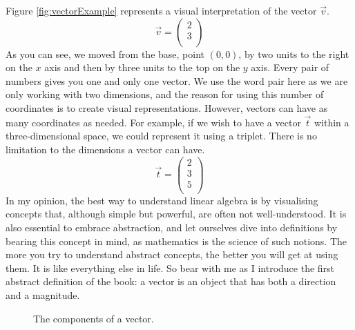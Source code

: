 \documentclass[600paper, 11pt,twoside,openany]{kdp}
\begin{document}
\indent Figure \ref{fig:vectorExample} represents a visual interpretation of the vector $\overrightarrow{v}$.
\[\overrightarrow{v} = \begin{pmatrix}
 2\\
 3\\
\end{pmatrix}\]
\indent As you can see, we moved from the base, point $(0,0)$, by two units to the right on the $x$ axis and then by three units to the top on the $y$ axis. Every pair of numbers gives you one and only one vector. We use the word pair here as we are only working with two dimensions, and the reason for using this number of coordinates is to create visual representations. However, vectors can have as many coordinates as needed. For example, if we wish to have a vector $\overrightarrow{t}$ within a three-dimensional space, we could represent it using a triplet. There is no limitation to the dimensions a vector can have.
\[\overrightarrow{t} = \begin{pmatrix}
 2\\
 3\\
 5\\
\end{pmatrix}\]
\indent In my opinion, the best way to understand linear algebra is by visualising concepts that, although simple but powerful, are often not well-understood. It is also essential to embrace abstraction, and let ourselves dive into definitions by bearing this concept in mind, as mathematics is the science of such notions. The more you try to understand abstract concepts, the better you will get at using them. It is like everything else in life. So bear with me as I introduce the first abstract definition of the book: a vector is an object that has both a direction and a magnitude.

\begin{figure}[h!]
\begin{center}
\end{center}
\caption{The components of a vector.}\label{fig:vectorcomponents}
\end{figure}
\end{document}
